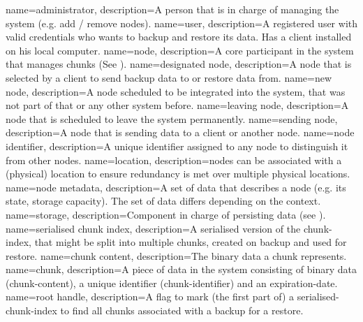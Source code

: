 {
    name={administrator},
    description={A person that is in charge of managing the system (e.g. add / remove nodes).}
}
{
    name={user},
    description={A registered user with valid credentials who wants to backup and restore its data. Has a client installed on his local computer.}
}
{
    name={node},
    description={A core participant in the system that manages \glspl{chunk} (See ).}
}
{
    name={designated node},
    description={A \gls{node} that is selected by a \gls{client} to send backup data to or restore data from.}
}
{
    name={new node},
    description={A \gls{node} scheduled to be integrated into the system, that was not part of that or any other system before.}
}
{
    name={leaving node},
    description={A \gls{node} that is scheduled to leave the system permanently.}
}
{
    name={sending node},
    description={A \gls{node} that is sending data to a client or another node.}
}
{
    name={node identifier},
    description={A unique identifier assigned to any node to distinguish it from other \glspl{node}.}
}
{
    name={location},
    description={\Glspl{node} can be associated with a (physical) location to ensure redundancy is met over multiple physical locations.}
}
{
    name={node metadata},
    description={A set of data that describes a \gls{node} (e.g. its state, storage capacity). The set of data differs depending on the context.}
}
{
    name={storage},
    description={Component in charge of persisting data (see ).}
}
{
    name={serialised chunk index},
    description={A serialised version of the \gls{chunk-index}, that might be split into multiple chunks, created on backup and used for restore.}
}
{
    name={chunk content},
    description={The binary data a chunk represents.}
}
{
    name={chunk},
    description={A piece of data in the system consisting of binary data (\gls{chunk-content}), a unique identifier (\gls{chunk-identifier}) and an \gls{expiration-date}.}
}
{
    name={root handle},
    description={A flag to mark (the first part of) a \gls{serialised-chunk-index} to find all chunks associated with a backup for a restore.}
}

